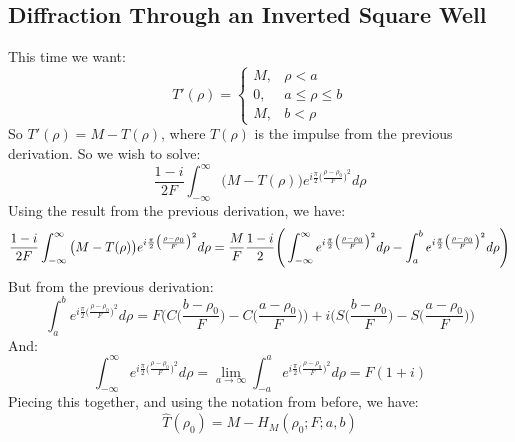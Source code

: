 \documentclass[crop=false,class=book,oneside]{standalone}
\begin{document}
        \subsection{Diffraction Through an Inverted Square Well}
            This time we want:
            \begin{equation*}
                T'(\rho) = \begin{cases} M, & \rho<a \\ 0, & a\leq \rho \leq b \\ M, & b<\rho\end{cases}    
            \end{equation*}
            So $T'(\rho) = M - T(\rho)$, where $T(\rho)$ is the impulse from the previous derivation. So we wish to solve:
            \begin{equation*}
            \frac{1-i}{2F}\int_{-\infty}^{\infty}\big(M-T(\rho)\big)e^{i\frac{\pi}{2}\big(\frac{\rho-\rho_0}{F}\big)^2}d\rho
            \end{equation*}
            Using the result from the previous derivation, we have:
            \begin{equation*}
            \frac{1-i}{2F}\int_{-\infty}^{\infty}\big(M-T(\rho)\big)e^{i\frac{\pi}{2}\big(\frac{\rho-\rho_0}{F}\big)^2}d\rho = \frac{M}{F}\frac{1-i}{2}\Bigg(\int_{-\infty}^{\infty}e^{i\frac{\pi}{2}\big(\frac{\rho-\rho_0}{F}\big)^2}d\rho - \int_{a}^{b}e^{i\frac{\pi}{2}\big(\frac{\rho-\rho_0}{F}\big)^2}d\rho\Bigg)\\
            \end{equation*}
            But from the previous derivation:
            \begin{equation*}
                \int_{a}^{b}e^{i\frac{\pi}{2}\big(\frac{\rho-\rho_0}{F}\big)^{2}}d\rho = F\bigg(C\big(\frac{b-\rho_0}{F}\big)-C\big(\frac{a-\rho_0}{F}\big)\bigg)+i\bigg(S\big(\frac{b-\rho_0}{F}\big)-S\big(\frac{a-\rho_0}{F}\big)\bigg)
            \end{equation*}
            And:
            \begin{equation*}
                \int_{-\infty}^{\infty}e^{i\frac{\pi}{2}\big(\frac{\rho-\rho_0}{F}\big)^{2}}d\rho = \underset{a\rightarrow \infty}{\lim} \int_{-a}^{a}e^{i\frac{\pi}{2}\big(\frac{\rho-\rho_0}{F}\big)^{2}}d\rho = F(1+i)
            \end{equation*}
            Piecing this together, and using the notation from before, we have:
            \begin{equation*}
            \hat{T}(\rho_0) = M-H_{M}(\rho_0;F;a,b)
            \end{equation*}
\end{document}
